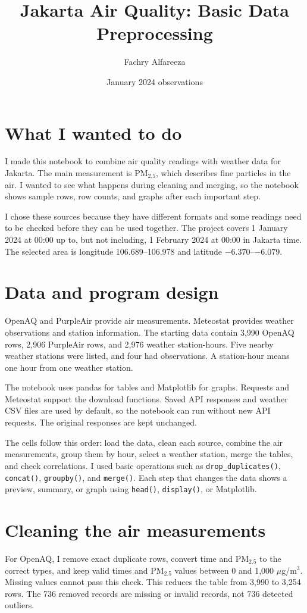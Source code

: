 \documentclass[11pt,a4paper]{article}
\title{Jakarta Air Quality: Basic Data Preprocessing}
\author{Fachry Alfareeza}
\date{January 2024 observations}
\begin{document}
\maketitle
\section{What I wanted to do}
I made this notebook to combine air quality readings with weather data for Jakarta. The main measurement is PM$_{2.5}$, which describes fine particles in the air. I wanted to see what happens during cleaning and merging, so the notebook shows sample rows, row counts, and graphs after each important step.

I chose these sources because they have different formats and some readings need to be checked before they can be used together. The project covers 1 January 2024 at 00:00 up to, but not including, 1 February 2024 at 00:00 in Jakarta time. The selected area is longitude 106.689--106.978 and latitude $-6.370$--$-6.079$.
\section{Data and program design}
OpenAQ and PurpleAir provide air measurements. Meteostat provides weather observations and station information. The starting data contain 3,990 OpenAQ rows, 2,906 PurpleAir rows, and 2,976 weather station-hours. Five nearby weather stations were listed, and four had observations. A station-hour means one hour from one weather station.

The notebook uses pandas for tables and Matplotlib for graphs. Requests and Meteostat support the download functions. Saved API responses and weather CSV files are used by default, so the notebook can run without new API requests. The original responses are kept unchanged.

The cells follow this order: load the data, clean each source, combine the air measurements, group them by hour, select a weather station, merge the tables, and check correlations. I used basic operations such as \texttt{drop\_duplicates()}, \texttt{concat()}, \texttt{groupby()}, and \texttt{merge()}. Each step that changes the data shows a preview, summary, or graph using \texttt{head()}, \texttt{display()}, or Matplotlib.
\section{Cleaning the air measurements}
For OpenAQ, I remove exact duplicate rows, convert time and PM$_{2.5}$ to the correct types, and keep valid times and PM$_{2.5}$ values between 0 and 1,000 $\mu$g/m$^3$. Missing values cannot pass this check. This reduces the table from 3,990 to 3,254 rows. The 736 removed records are missing or invalid records, not 736 detected outliers.
\end{document}
